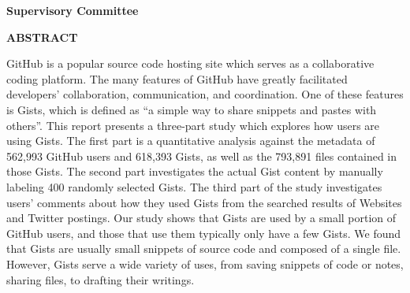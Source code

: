 \newpage
{}

\noindent \textbf{Supervisory Committee}
\tpbreak
\panel

\begin{center}
\textbf{ABSTRACT}
\end{center}

GitHub is a popular source code hosting site which serves as a collaborative coding platform. The many features of GitHub have greatly facilitated developers' collaboration, communication, and coordination. One of these features is Gists, which is defined as ``a simple way to share snippets and pastes with others''. This report presents a three-part study which explores how users are using Gists. The first part is a quantitative analysis against the metadata of 562,993 GitHub users and 618,393 Gists, as well as the 793,891 files contained in those Gists. The second part investigates the actual Gist content by manually labeling 400 randomly selected Gists. The third part of the study investigates users' comments about how they used Gists from the searched results of Websites and Twitter postings. Our study shows that Gists are used by a small portion of GitHub users, and those that use them typically only have a few Gists. We found that Gists are usually small snippets of source code and composed of a single file. However, Gists serve a wide variety of uses, from saving snippets of code or notes, sharing files, to drafting their writings.
